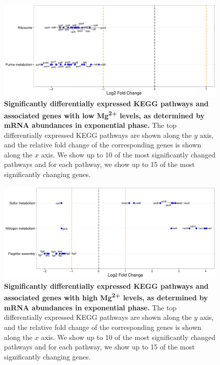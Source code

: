 \documentclass[a4paper]{article}
\begin{document}
\clearpage
\begin{figure}
	\includegraphics[width=1.0\textwidth]{../../d_figures/kegg_09.pdf}
	\caption[Significantly differentially expressed KEGG pathways for mRNA samples in exponential phase tested for low Mg\textsuperscript{2+} levels against base Mg\textsuperscript{2+}]
	{\textbf{Significantly differentially expressed KEGG pathways and associated genes with low Mg\textsuperscript{2+} levels, as determined by mRNA abundances in exponential phase.} The top differentially expressed KEGG pathways are shown along the $y$ axis, and the relative fold change of the corresponding genes is shown along the $x$ axis. We show up to 10 of the most significantly changed pathways and for each pathway, we show up to 15 of the most significantly changing genes.}
\end{figure}

\clearpage
\begin{figure}
	\includegraphics[width=1.0\textwidth]{../../d_figures/kegg_10.pdf}
	\caption[Significantly differentially expressed KEGG pathways for mRNA samples in exponential phase tested for high Mg\textsuperscript{2+} against base Mg\textsuperscript{2+}]
	{\textbf{Significantly differentially expressed KEGG pathways and associated genes with high Mg\textsuperscript{2+} levels, as determined by mRNA abundances in exponential phase.} The top differentially expressed KEGG pathways are shown along the $y$ axis, and the relative fold change of the corresponding genes is shown along the $x$ axis. We show up to 10 of the most significantly changed pathways and for each pathway, we show up to 15 of the most significantly changing genes.}
\end{figure}
\end{document}
